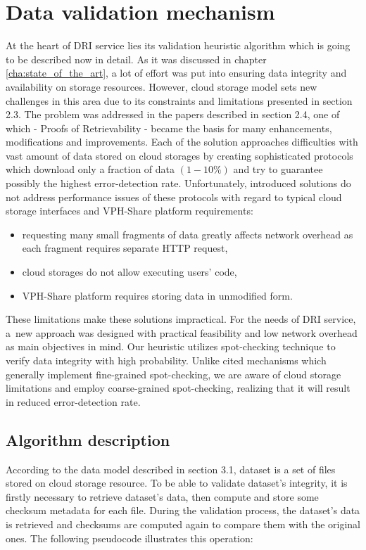 	\section{Data validation mechanism}
	\label{section:validation-algorithm}
At the heart of DRI service lies its validation heuristic algorithm which is
going to be described now in detail. As it was discussed in chapter 
\ref{cha:state_of_the_art}, a lot of 
effort was put into ensuring data integrity and availability on storage
resources. However, cloud storage model sets new challenges in this area due to
its constraints and limitations presented in section 2.3. The problem was
addressed in the papers described in section 2.4, one of which - Proofs of
Retrievability - became the basis for many enhancements, modifications and
improvements. Each of the solution approaches difficulties with vast amount of
data stored on cloud storages by creating sophisticated protocols which download
only a fraction of data $(1-10\%)$ and try to guarantee possibly the highest
error-detection rate. Unfortunately, introduced solutions do not address
performance issues of these protocols with regard to typical cloud storage
interfaces and VPH-Share platform requirements:

\begin{itemize}
	\item requesting many small fragments of data greatly affects network
	overhead as each fragment requires separate HTTP request,
	\item cloud storages do not allow executing users' code,
	\item VPH-Share platform requires storing data in unmodified form.
\end{itemize}

These limitations make these solutions impractical. For the needs of DRI
service, a~new approach was designed with practical feasibility and low network
overhead as main objectives in mind. Our heuristic utilizes spot-checking
technique \cite{por, pdp, dip, ric} to verify data integrity with high
probability. Unlike cited mechanisms \cite{dip, por} which generally implement
fine-grained spot-checking, we are aware of cloud storage limitations and
employ coarse-grained spot-checking, realizing that it will result in reduced
error-detection rate.

		\subsection{Algorithm description}
According to the data model described in section 3.1, dataset is a set of files
stored on cloud storage resource. To be able to validate dataset's integrity,
it is firstly necessary to retrieve dataset's data, then compute and store some
checksum metadata for each file. During the validation process, the dataset's
data is retrieved and checksums are computed again to compare them with the
original ones. The following pseudocode illustrates this operation:

